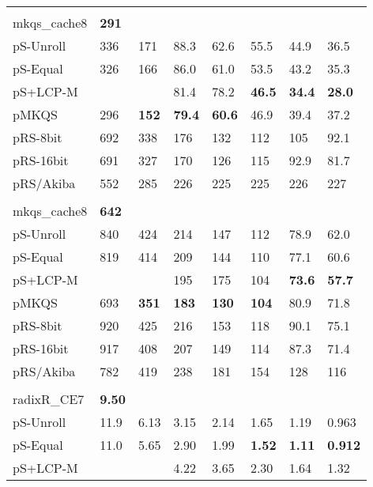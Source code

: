 \documentclass[a4paper]{myjournal}
\begin{document}
\begin{table}
\begin{tabularx}{\linewidth}{l|*{7}{>{\hfill}X}|@{}}
& \multicolumn{7}{l|}{\textbf{GOV2}, , , } \\ \cline{2-8}
mkqs\_cache8 & \bf 291 &  &  &  &  &  &  \\
pS-Unroll & 336 &     171 &     88.3 &     62.6 &     55.5 &     44.9 &     36.5 \\
 pS-Equal & 326 &     166 &     86.0 &     61.0 &     53.5 &     43.2 &     35.3 \\
 pS+LCP-M &     &         &     81.4 &     78.2 & \bf 46.5 & \bf 34.4 & \bf 28.0 \\
        pMKQS & 296 & \bf 152 & \bf 79.4 & \bf 60.6 &     46.9 &     39.4 &     37.2 \\
     pRS-8bit & 692 &     338 &      176 &      132 &      112 &      105 &     92.1 \\
    pRS-16bit & 691 &     327 &      170 &      126 &      115 &     92.9 &     81.7 \\
    pRS/Akiba & 552 &     285 &      226 &      225 &      225 &      226 &      227 \\ \hline
& \multicolumn{7}{l|}{\textbf{Wikipedia}, , } \\ \cline{2-8}
mkqs\_cache8 & \bf 642 &  &  &  &  &  &  \\
pS-Unroll & 840 &     424 &     214 &     147 &     112 &     78.9 &     62.0 \\
 pS-Equal & 819 &     414 &     209 &     144 &     110 &     77.1 &     60.6 \\
 pS+LCP-M &     &         &     195 &     175 &     104 & \bf 73.6 & \bf 57.7 \\
        pMKQS & 693 & \bf 351 & \bf 183 & \bf 130 & \bf 104 &     80.9 &     71.8 \\
     pRS-8bit & 920 &     425 &     216 &     153 &     118 &     90.1 &     75.1 \\
    pRS-16bit & 917 &     408 &     207 &     149 &     114 &     87.3 &     71.4 \\
    pRS/Akiba & 782 &     419 &     238 &     181 &     154 &      128 &      116 \\ \hline
& \multicolumn{7}{l|}{\textbf{Sinha NoDup} (complete), , , } \\ \cline{2-8}
radixR\_CE7 & \bf 9.50 &  &  &  &  &  &  \\
pS-Unroll & 11.9 &     6.13 &     3.15 &     2.14 &     1.65 &     1.19 &     0.963 \\
 pS-Equal & 11.0 &     5.65 &     2.90 &     1.99 & \bf 1.52 & \bf 1.11 & \bf 0.912 \\
 pS+LCP-M &      &          &     4.22 &     3.65 &     2.30 &     1.64 &      1.32 \\

\end{tabularx}
\end{table}
\end{document}
